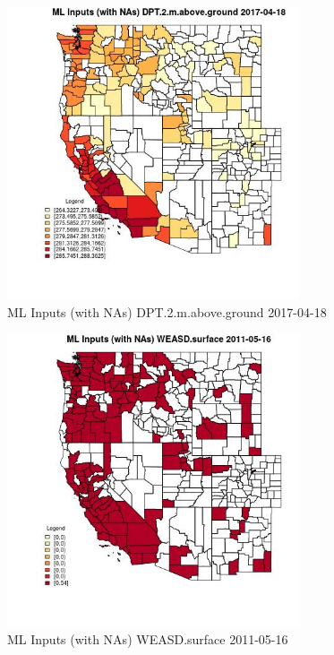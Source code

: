 \begin{figure} 
\centering  
\includegraphics[width=0.77\textwidth]{Code_Outputs/Report_ML_input_PM25_Step4_part_e_de_duplicated_aves_compiled_2019-05-20wNAs_CountyDPT2mabovegroundMean2017-04-18.jpg} 
\caption{\label{fig:Report_ML_input_PM25_Step4_part_e_de_duplicated_aves_compiled_2019-05-20wNAsCountyDPT2mabovegroundMean2017-04-18}ML Inputs (with NAs) DPT.2.m.above.ground 2017-04-18} 
\end{figure} 
 

\begin{figure} 
\centering  
\includegraphics[width=0.77\textwidth]{Code_Outputs/Report_ML_input_PM25_Step4_part_e_de_duplicated_aves_compiled_2019-05-20wNAs_CountyWEASDsurfaceMean2011-05-16.jpg} 
\caption{\label{fig:Report_ML_input_PM25_Step4_part_e_de_duplicated_aves_compiled_2019-05-20wNAsCountyWEASDsurfaceMean2011-05-16}ML Inputs (with NAs) WEASD.surface 2011-05-16} 
\end{figure} 
 

